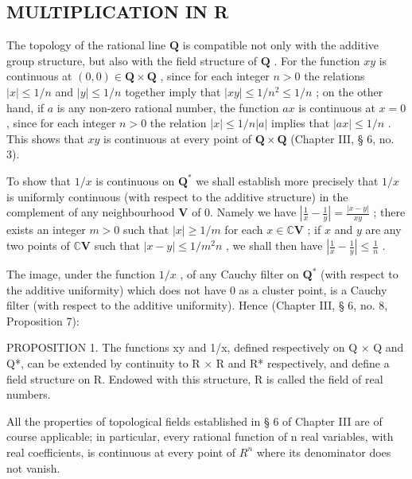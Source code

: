 \subsection{MULTIPLICATION IN R}

The topology of the rational line \(\mathbf{Q}\) is compatible not only with the additive group structure, but also with the field structure of \(\mathbf{Q}\) . For the function \(xy\) is continuous at \((0, 0) \in \mathbf{Q} \times \mathbf{Q}\) , since for each integer \(n > 0\) the relations \(|x| \leqslant 1/n\) and \(|y| \leqslant 1/n\) together imply that \(|xy| \leqslant 1/n^2 \leqslant 1/n\) ; on the other hand, if \(a\) is any non-zero rational number, the function \(ax\) is continuous at \(x = 0\) , since for each integer \(n > 0\) the relation \(|x| \leqslant 1/n |a|\) implies that \(|ax| \leqslant 1/n\) . This shows that \(xy\) is continuous at every point of \(\mathbf{Q} \times \mathbf{Q}\) (Chapter III, § 6, no. 3).

To show that \(1 / x\) is continuous on \(\mathbf{Q}^*\) we shall establish more precisely that \(1 / x\) is uniformly continuous (with respect to the additive structure) in the complement of any neighbourhood \(\mathbf{V}\) of 0. Namely we have \(\left|\frac{1}{x} - \frac{1}{y}\right| = \frac{|x - y|}{xy}\) ; there exists an integer \(m > 0\) such that \(|x| \geqslant 1 / m\) for each \(x \in \mathbb{C}\mathbf{V}\) ; if \(x\) and \(y\) are any two points of \(\mathbb{C}\mathbf{V}\) such that \(|x - y| \leqslant 1 / m^2 n\) , we shall then have \(\left|\frac{1}{x} - \frac{1}{y}\right| \leqslant \frac{1}{n}\) .

The image, under the function \(1 / x\) , of any Cauchy filter on \(\mathbf{Q}^*\) (with respect to the additive uniformity) which does not have \(0\) as a cluster point, is a Cauchy filter (with respect to the additive uniformity). Hence (Chapter III, § 6, no. 8, Proposition 7):

PROPOSITION 1. The functions xy and 1/x, defined respectively on Q × Q and Q*, can be extended by continuity to R × R and R* respectively, and define a field structure on R. Endowed with this structure, R is called the field of real numbers.

All the properties of topological fields established in § 6 of Chapter III are of course applicable; in particular, every rational function of n real variables, with real coefficients, is continuous at every point of \(R^{n}\) where its denominator does not vanish.

